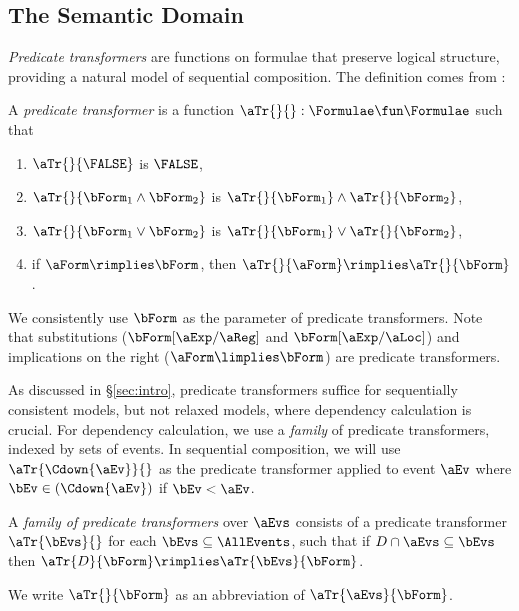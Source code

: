 \subsection{The Semantic Domain} %
\label{sec:pomsets}

\emph{Predicate transformers} are functions on formulae that preserve
logical structure, providing a natural model of sequential composition.
The definition comes from \citet{DBLP:journals/cacm/Dijkstra75}:

\begin{definition}
  \label{def:trans}
  A \emph{predicate transformer} is a %
  function
  $\aTr{}{}:\Formulae\fun\Formulae$ such that
  \begin{multicols}{2}
    \begin{enumerate}[,label=(\textsc{x}\arabic*),ref=\textsc{x}\arabic*]
    \item \label{tr-false}
      $\aTr{}{\FALSE}$ is $\FALSE$,    
    \item \label{tr-and}
      $\aTr{}{\bForm_1\land\bForm_2}$ is $\aTr{}{\bForm_1}\land\aTr{}{\bForm_2}$,    
    \item \label{tr-or}
      $\aTr{}{\bForm_1\lor\bForm_2}$ is $\aTr{}{\bForm_1}\lor\aTr{}{\bForm_2}$, 
    \item \label{tr-implies}
      if $\aForm \rimplies \bForm$, then $\aTr{}{\aForm} \rimplies
      \aTr{}{\bForm}$.
    \end{enumerate}
  \end{multicols}
\end{definition}
\noindent
We consistently use $\bForm$ as the parameter of predicate transformers.
Note that substitutions ($\bForm[\aExp/\aReg]$ and $\bForm[\aExp/\aLoc]$) and
implications on the right ($\aForm\limplies\bForm$) are predicate
transformers.

As discussed in \S\ref{sec:intro}, predicate transformers suffice for
sequentially consistent models, but not relaxed models, where dependency
calculation is crucial.  For dependency calculation, we use a \emph{family}
of predicate transformers, indexed by sets of events. In sequential
composition, we will use $\aTr{\Cdown{\aEv}}{}$ as the predicate transformer
applied to event $\aEv$ where $\bEv\in(\Cdown{\aEv})$ if $\bEv<\aEv$.

\begin{definition}
  \label{def:family}
  A \emph{family of predicate transformers} over $\aEvs$ consists of a
  predicate transformer $\aTr{\bEvs}{}$ for each $\bEvs\subseteq\AllEvents$,
  such that if $\cEvs \cap \aEvs \subseteq \bEvs$ then $\aTr{\cEvs}{\bForm}
  \rimplies \aTr{\bEvs}{\bForm}$.

  We write $\aTr{}{\bForm}$ as an abbreviation of $\aTr{\aEvs}{\bForm}$.
\end{definition}

